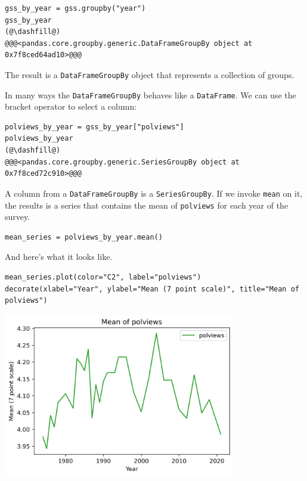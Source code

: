 \begin{lstlisting}[]
gss_by_year = gss.groupby("year")
gss_by_year
(@\dashfill@)
@@@<pandas.core.groupby.generic.DataFrameGroupBy object at 0x7f8ced64ad10>@@@
\end{lstlisting}

The result is a \passthrough{\lstinline!DataFrameGroupBy!} object that
represents a collection of groups.

In many ways the \passthrough{\lstinline!DataFrameGroupBy!} behaves like
a \passthrough{\lstinline!DataFrame!}. We can use the bracket operator
to select a column:

\begin{lstlisting}[]
polviews_by_year = gss_by_year["polviews"]
polviews_by_year
(@\dashfill@)
@@@<pandas.core.groupby.generic.SeriesGroupBy object at 0x7f8ced72c910>@@@
\end{lstlisting}

A column from a \passthrough{\lstinline!DataFrameGroupBy!} is a
\passthrough{\lstinline!SeriesGroupBy!}. If we invoke
\passthrough{\lstinline!mean!} on it, the results is a series that
contains the mean of \passthrough{\lstinline!polviews!} for each year of
the survey.

\begin{lstlisting}[]
mean_series = polviews_by_year.mean()
\end{lstlisting}

And here's what it looks like.

\begin{lstlisting}[]
mean_series.plot(color="C2", label="polviews")
decorate(xlabel="Year", ylabel="Mean (7 point scale)", title="Mean of polviews")
\end{lstlisting}

\begin{center}
\includegraphics[width=4in]{chapters/02_polviews_files/02_polviews_50_0.png}
\end{center}

